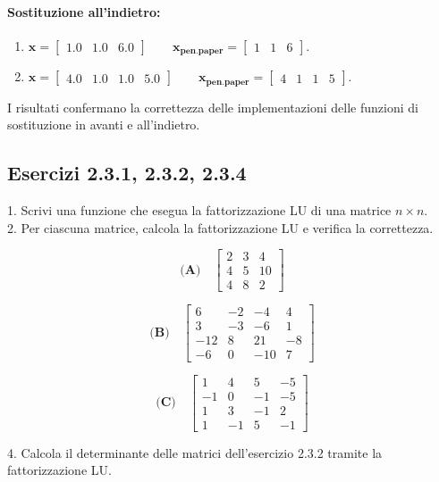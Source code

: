 \documentclass[letterpaper, 12pt]{article}
\numberwithin{equation}{section}    %
\begin{document}
\paragraph{Sostituzione all'indietro:}
\begin{enumerate}[label=(\alph*)]
    \item $\mathbf{x} = \begin{bmatrix} 1.0 & 1.0 & 6.0 \end{bmatrix} \qquad \mathbf{x_{pen.paper}} = \begin{bmatrix} 1 & 1 & 6 \end{bmatrix}$.
    \item $\mathbf{x} = \begin{bmatrix} 4.0 & 1.0 & 1.0 & 5.0 \end{bmatrix} \qquad \mathbf{x_{pen.paper}} = \begin{bmatrix} 4 & 1 & 1 & 5 \end{bmatrix}$.
\end{enumerate}

I risultati confermano la correttezza delle implementazioni delle funzioni di sostituzione in avanti e all'indietro.

\subsection{Esercizi 2.3.1, 2.3.2, 2.3.4}
1. Scrivi una funzione che esegua la fattorizzazione LU di una matrice $n\times n$.\\
2. Per ciascuna matrice, calcola la fattorizzazione LU e verifica la correttezza.\\
\begin{center}
    \begin{minipage}{0.32\textwidth}
    \centering
    \[
    \textbf{(A)}\quad
    \begin{bmatrix}
    2 & 3 & 4 \\
    4 & 5 & 10 \\
    4 & 8 & 2
    \end{bmatrix}
    \]
    \end{minipage}
    \hfill
    \begin{minipage}{0.32\textwidth}
    \centering
    \[
    \textbf{(B)}\quad
    \begin{bmatrix}
    6 & -2 & -4 & 4\\
    3 & -3 & -6 & 1 \\
    -12 & 8 & 21 & -8 \\
    -6 & 0 & -10 & 7
    \end{bmatrix}
    \]
    \end{minipage}
    \hfill
    \begin{minipage}{0.32\textwidth}
    \centering
    \[
    \textbf{(C)}\quad
    \begin{bmatrix}
    1 & 4 & 5 & -5 \\
    -1 & 0 & -1 & -5 \\
    1 & 3 & -1 & 2 \\
    1 & -1 & 5 & -1 
    \end{bmatrix}
    \]
    \end{minipage}
\end{center}
4. Calcola il determinante delle matrici dell'esercizio 2.3.2 tramite la fattorizzazione LU.
\end{document}
